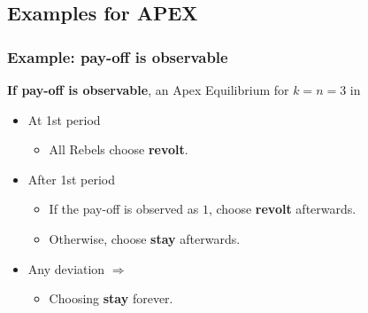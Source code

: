 \documentclass[9pt]{beamer}
\begin{document}
\subsection{Examples for APEX}

\begin{frame}[label=ex_observable]
  \frametitle{Example: pay-off is observable}

\alert{\textbf{If pay-off is observable}}, an Apex Equilibrium for $k=n=3$ in
  \begin{center}
\end{center}

\begin{itemize}[<+->]
\item At 1st period
\begin{itemize}
\item All Rebels choose \textbf{revolt}.
\end{itemize}

\item After 1st period
\begin{itemize}
\item If the pay-off is observed as $1$, choose \textbf{revolt} afterwards.
\item Otherwise, choose \textbf{stay} afterwards.
\end{itemize}
 
 \item Any deviation $\Rightarrow$
 \begin{itemize}
 \item Choosing \textbf{stay} forever.
 \end{itemize}
\end{itemize}

  
\end{frame}
\end{document}
